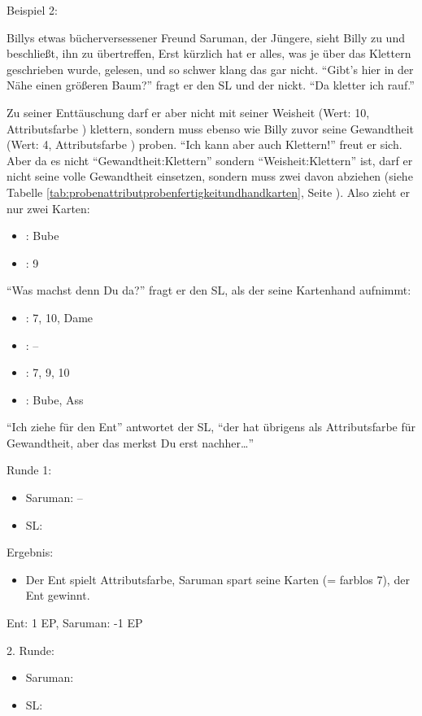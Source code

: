 Beispiel 2:

Billys etwas bücherversessener Freund Saruman, der Jüngere, sieht Billy zu und beschließt, ihn zu übertreffen, Erst kürzlich hat er alles, was je über das Klettern geschrieben wurde, gelesen, und so schwer klang das gar nicht. "`Gibt's hier in der Nähe einen größeren Baum?"' fragt er den SL und der nickt. "`Da kletter ich rauf."'

Zu seiner Enttäuschung darf er aber nicht mit seiner Weisheit (Wert: 10, Attributsfarbe \karo) klettern, sondern muss ebenso wie Billy zuvor seine Gewandtheit (Wert: 4, Attributsfarbe \kreuz) proben. "`Ich kann aber auch Klettern!"' freut er sich. Aber da es nicht "`Gewandtheit:Klettern"' sondern "`Weisheit:Klettern"' ist, darf er nicht seine volle Gewandtheit einsetzen, sondern muss zwei davon abziehen (siehe Tabelle \ref {tab:probenattributprobenfertigkeitundhandkarten}, Seite \pageref {tab:probenattributprobenfertigkeitundhandkarten}). Also zieht er nur zwei Karten:
\begin {itemize}
\item \karo: Bube
\item \kreuz: 9
\end {itemize}

"`Was machst denn Du da?"' fragt er den SL, als der seine Kartenhand aufnimmt:
\begin {itemize}
\item \herz: 7, 10, Dame
\item \karo: --
\item \pik: 7, 9, 10
\item \kreuz: Bube, Ass
\end {itemize}

"`Ich ziehe für den Ent"' antwortet der SL, "`der hat übrigens \pik als Attributsfarbe für Gewandtheit, aber das merkst Du erst nachher\dots"'

Runde 1:
\begin {itemize}
\item Saruman: --
\item SL: 
\end {itemize}

Ergebnis: 
\begin {itemize}
\item Der Ent spielt Attributsfarbe, Saruman spart seine Karten (= farblos 7), der Ent gewinnt. 
\end {itemize}
Ent: 1 EP, Saruman: -1 EP

2. Runde:
\begin {itemize}
\item Saruman: 
\item SL: 
\end {itemize}

